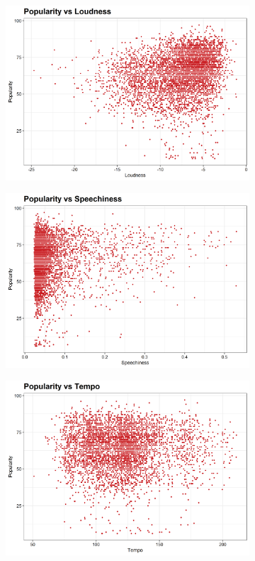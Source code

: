 \documentclass[12pt, twoside]{article}
\begin{document}
\begin{figure}[H]
\begin{subfigure}[b]{0.5\textwidth}
\includegraphics[width = \textwidth]{pop_vs_track_loudness.png}
\caption{}
\label{fig:duration_trend}
\end{subfigure}
\begin{subfigure}[b]{0.5\textwidth}
\centering
\includegraphics[width = \textwidth]{pop_vs_track_speechiness.png}
\caption{}
\label{fig:duration_trend}
\end{subfigure}
\begin{subfigure}[b]{0.5\textwidth}
\centering
\includegraphics[width = \textwidth]{pop_vs_track_tempo.png}

\end{subfigure}
\end{figure}
\end{document}
